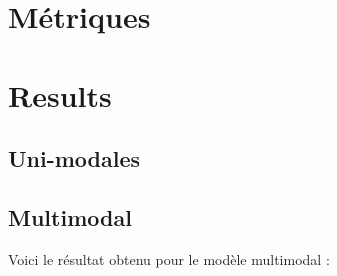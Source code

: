 \documentclass[a4paper]{article}
\begin{document}
\section{Métriques}

\section{Results}

\subsection{Uni-modales}



\subsection{Multimodal}

Voici le résultat obtenu pour le modèle multimodal :
\end{document}
